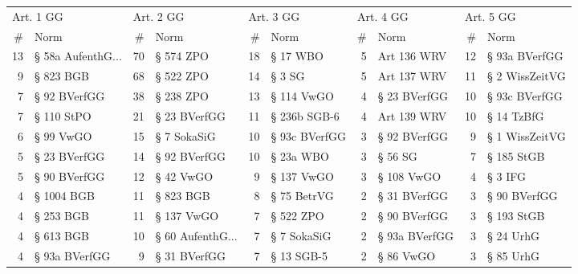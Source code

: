 \begin{tabular}{rlrlrlrlrl}
\toprule
\multicolumn{2}{l}{Art. 1 GG} & \multicolumn{2}{l}{Art. 2 GG} & \multicolumn{2}{l}{Art. 3 GG} & \multicolumn{2}{l}{Art. 4 GG} & \multicolumn{2}{l}{Art. 5 GG} \\
        \# &                Norm &         \# &               Norm &         \# &          Norm &         \# &           Norm &         \# &            Norm \\
\midrule
       13 & § 58a AufenthG... &        70 &          § 574 ZPO &        18 &      § 17 WBO &         5 &    Art 136 WRV &        12 &   § 93a BVerfGG \\
        9 &           § 823 BGB &        68 &          § 522 ZPO &        14 &        § 3 SG &         5 &    Art 137 WRV &        11 &  § 2 WissZeitVG \\
        7 &        § 92 BVerfGG &        38 &          § 238 ZPO &        13 &    § 114 VwGO &         4 &   § 23 BVerfGG &        10 &   § 93c BVerfGG \\
        7 &          § 110 StPO &        21 &       § 23 BVerfGG &        11 &  § 236b SGB-6 &         4 &    Art 139 WRV &        10 &      § 14 TzBfG \\
        6 &           § 99 VwGO &        15 &        § 7 SokaSiG &        10 & § 93c BVerfGG &         3 &   § 92 BVerfGG &         9 &  § 1 WissZeitVG \\
        5 &        § 23 BVerfGG &        14 &       § 92 BVerfGG &        10 &     § 23a WBO &         3 &        § 56 SG &         7 &      § 185 StGB \\
        5 &        § 90 BVerfGG &        12 &          § 42 VwGO &         9 &    § 137 VwGO &         3 &     § 108 VwGO &         4 &         § 3 IFG \\
        4 &          § 1004 BGB &        11 &          § 823 BGB &         8 &   § 75 BetrVG &         2 &   § 31 BVerfGG &         3 &    § 90 BVerfGG \\
        4 &           § 253 BGB &        11 &         § 137 VwGO &         7 &     § 522 ZPO &         2 &   § 90 BVerfGG &         3 &      § 193 StGB \\
        4 &           § 613 BGB &        10 & § 60 AufenthG... &         7 &   § 7 SokaSiG &         2 &  § 93a BVerfGG &         3 &       § 24 UrhG \\
        4 &       § 93a BVerfGG &         9 &       § 31 BVerfGG &         7 &    § 13 SGB-5 &         2 &      § 86 VwGO &         3 &       § 85 UrhG \\

\end{tabular}
